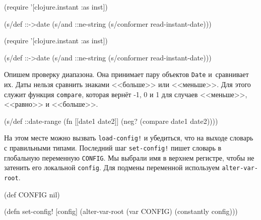 
\ifx\devicetype\mobile

\begin{english}
  \begin{clojure}
(require '[clojure.instant :as inst])

(s/def ::->date
  (s/and ::ne-string
    (s/conformer read-instant-date)))
  \end{clojure}
\end{english}

\else

\begin{english}
  \begin{clojure}
(require '[clojure.instant :as inst])

(s/def ::->date
  (s/and ::ne-string (s/conformer read-instant-date)))
  \end{clojure}
\end{english}

\fi


Опишем проверку диапазона. Она принимает пару объектов \verb|Date| и~сравнивает
их. Даты нельзя сравнить знаками <<больше>> или <<меньше>>. Для этого служит
функция \verb|compare|, которая вернёт -1, 0 и 1 для случаев <<меньше>>, <<равно>> и
<<больше>>.

\begin{english}
  \begin{clojure}
(s/def ::date-range
  (fn [[date1 date2]]
    (neg? (compare date1 date2))))
  \end{clojure}
\end{english}

На этом месте можно вызвать \verb|load-config!| и убедиться, что на выходе
словарь с правильными типами. Последний шаг \verb|set-config!| пишет словарь в
глобальную переменную \verb|CONFIG|. Мы выбрали имя в верхнем регистре, чтобы не
затенить его локальной \verb|config|. Для подмены переменной используем
\verb|alter-var-root|.


\ifx\devicetype\mobile

\begin{english}
  \begin{clojure}
(def CONFIG nil)

(defn set-config!
  [config]
  (alter-var-root (var CONFIG)
    (constantly config)))
  \end{clojure}
\end{english}

